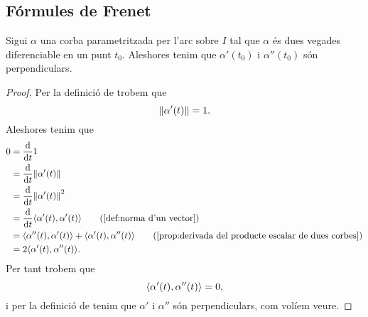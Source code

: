 \documentclass[../Apunts.tex]{subfiles}
\begin{document}
	\subsection{Fórmules de Frenet}
	\begin{proposition}
		\label{prop:la primera derivada i la segona derivada d'una corba són perpendiculars}
		Sigui \(\alpha\) una corba parametritzada per l'arc sobre \(I\) tal que \(\alpha\) és dues vegades diferenciable en un punt \(t_{0}\). Aleshores tenim que \(\alpha'(t_{0})\) i \(\alpha''(t_{0})\) són perpendiculars.
		\begin{proof}
			Per la definició de  trobem que
			\[\norm{\alpha'(t)}=1.\]
			Aleshores tenim que
			\begin{align*}
				0&=\frac{\diff}{\diff t}1 \\
				&=\frac{\diff}{\diff t}\norm{\alpha'(t)} \\
				&=\frac{\diff}{\diff t}\norm{\alpha'(t)}^{2} \\
				&=\frac{\diff}{\diff t}\prodesc{\alpha'(t)}{\alpha'(t)} \tag{\ref{def:norma d'un vector}} \\
				&=\prodesc{\alpha''(t)}{\alpha'(t)}+\prodesc{\alpha'(t)}{\alpha''(t)} \tag{\ref{prop:derivada del producte escalar de dues corbes}} \\
				&=2\prodesc{\alpha'(t)}{\alpha''(t)}.
			\end{align*}
			Per tant trobem que
			\[\prodesc{\alpha'(t)}{\alpha''(t)}=0,\]
			i per la definició de  tenim que \(\alpha'\) i \(\alpha''\) són perpendiculars, com volíem veure.
		\end{proof}
	\end{proposition}
\end{document}

